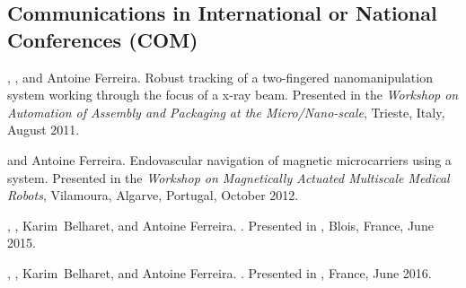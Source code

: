 \subsection[Communications in Conferences]{Communications in International or National Conferences (COM)}
\begin{Mybibliography}{10}
  \NAmari, \DavidFolio, and Antoine Ferreira.
  \newblock Robust tracking of a two-fingered nanomanipulation system working
  through the focus of a x-ray beam.
  \newblock Presented in the \emph{Workshop on Automation of Assembly and Packaging at
    the Micro/Nano-scale}, Trieste, Italy, August 2011.
  
  \DavidFolio and Antoine Ferreira.
  \newblock Endovascular navigation of magnetic microcarriers using a {\MRIshort}
  system.
  \newblock Presented in the \emph{Workshop on Magnetically Actuated Multiscale Medical
    Robots}, Vilamoura, Algarve, Portugal, October 2012.
  
  \LMellal, \DavidFolio, Karim~Belharet, and Antoine Ferreira.
  \newblock  {}.
  \newblock Presented in , Blois, France, June 2015.
  
  \LMellal, \DavidFolio, Karim~Belharet, and Antoine Ferreira.
  \newblock  {}.
  \newblock Presented in , France, June 2016.
  
\end{Mybibliography}

